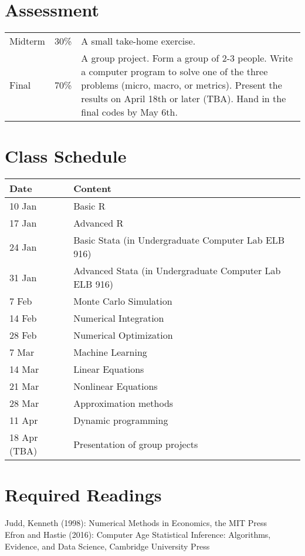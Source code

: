 \documentclass[11pt]{article}
\begin{document}
\section{Assessment}
\begin{tabular}{p{0.5in}p{0.5in}p{5in}}
   Midterm & 30\% & A small take-home exercise. \\
   Final  & 70\%  & A group project. Form a group of 2-3 people. Write a computer program to solve one of the three problems (micro, macro, or metrics). Present the results on April 18th or later (TBA). Hand in the final codes by May 6th.
\end{tabular}

\section{Class Schedule}
\begin{tabular}{p{1in}p{4in}}
  \hline
  Date & Content \\
  \hline
  10 Jan & Basic R \\
  17 Jan & Advanced R \\
  24 Jan & Basic Stata (in Undergraduate Computer Lab ELB 916) \\
  31 Jan & Advanced Stata (in Undergraduate Computer Lab ELB 916)  \\
  7 Feb &  Monte Carlo Simulation\\
  14 Feb & Numerical Integration \\
  28 Feb & Numerical Optimization  \\
  7 Mar &  Machine Learning  \\
  14 Mar & Linear Equations \\
  21 Mar & Nonlinear Equations \\
  28 Mar & Approximation methods \\
  11 Apr & Dynamic programming \\
  18 Apr (TBA) & Presentation of group projects \\
  \hline
\end{tabular}





\section{Required Readings}
Judd, Kenneth (1998): Numerical Methods in Economics, the MIT Press \\
Efron and Hastie (2016): Computer Age Statistical Inference: Algorithms, Evidence, and Data Science, Cambridge University Press
\end{document}
